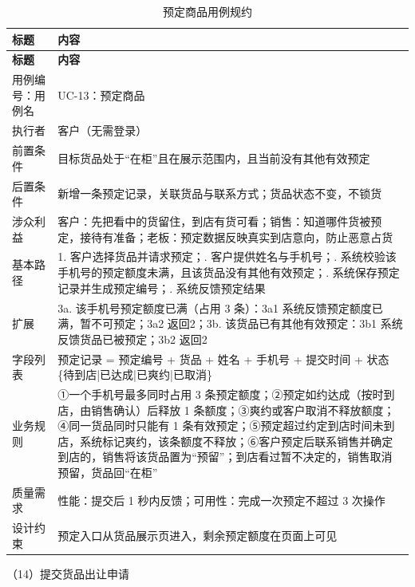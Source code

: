 \documentclass[12pt, a4paper]{ctexart}
\begin{document}
{\small
\begin{longtable}{@{}p{2.4cm} p{12.9cm}@{}}
\caption{预定商品用例规约}\label{tab:uc-13}\\
\toprule
\textbf{标题} & \textbf{内容} \\
\midrule
\endfirsthead
\toprule
\textbf{标题} & \textbf{内容} \\
\midrule
\endhead
用例编号：用例名 & UC-13：预定商品 \\
\midrule
执行者 & 客户（无需登录） \\
\midrule
前置条件 & 目标货品处于“在柜”且在展示范围内，且当前没有其他有效预定 \\
\midrule
后置条件 & 新增一条预定记录，关联货品与联系方式；货品状态不变，不锁货 \\
\midrule
涉众利益 & 客户：先把看中的货留住，到店有货可看；\newline 销售：知道哪件货被预定，接待有准备；\newline 老板：预定数据反映真实到店意向，防止恶意占货 \\
\midrule
基本路径 & 1. 客户选择货品并请求预定；\newline 2. 客户提供姓名与手机号；\newline 3. 系统校验该手机号的预定额度未满，且该货品没有其他有效预定；\newline 4. 系统保存预定记录并生成预定编号；\newline 5. 系统反馈预定结果 \\
\midrule
扩展 & 3a. 该手机号预定额度已满（占用 3 条）：3a1 系统反馈预定额度已满，暂不可预定；3a2 返回2；\newline 3b. 该货品已有其他有效预定：3b1 系统反馈货品已被预定；3b2 返回2 \\
\midrule
字段列表 & 预定记录 = 预定编号 + 货品 + 姓名 + 手机号 + 提交时间 + 状态\{待到店|已达成|已爽约|已取消\} \\
\midrule
业务规则 & ①一个手机号最多同时占用 3 条预定额度；\newline ②预定如约达成（按时到店，由销售确认）后释放 1 条额度；\newline ③爽约或客户取消不释放额度；\newline ④同一货品同时只能有 1 条有效预定；\newline ⑤预定超过约定到店时间未到店，系统标记爽约，该条额度不释放；\newline ⑥客户预定后联系销售并确定到店的，销售将该货品置为“预留”；到店看过暂不决定的，销售取消预留，货品回“在柜” \\
\midrule
质量需求 & 性能：提交后 1 秒内反馈；\newline 可用性：完成一次预定不超过 3 次操作 \\
\midrule
设计约束 & 预定入口从货品展示页进入，剩余预定额度在页面上可见 \\
\midrule
\bottomrule
\end{longtable}}
\noindent（14）提交货品出让申请
\end{document}
